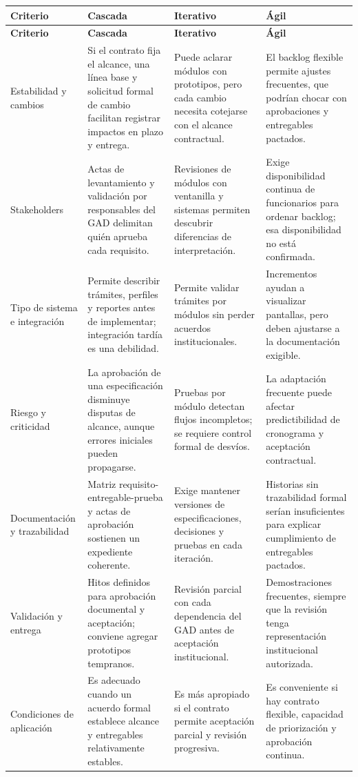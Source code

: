 \documentclass[10pt,a4paper,onecolumn]{IEEEtran}
\begin{document}
\footnotesize
\begin{longtable}{@{}p{2.42cm}p{4.5cm}p{4.5cm}p{4.5cm}@{}}
\toprule
\textbf{Criterio} & \textbf{Cascada} & \textbf{Iterativo} & \textbf{Ágil} \\
\midrule\endfirsthead
\toprule
\textbf{Criterio} & \textbf{Cascada} & \textbf{Iterativo} & \textbf{Ágil} \\
\midrule\endhead
Estabilidad y cambios & Si el contrato fija el alcance, una línea base y solicitud formal de cambio facilitan registrar impactos en plazo y entrega. & Puede aclarar módulos con prototipos, pero cada cambio necesita cotejarse con el alcance contractual. & El backlog flexible permite ajustes frecuentes, que podrían chocar con aprobaciones y entregables pactados. \\
\midrule
Stakeholders & Actas de levantamiento y validación por responsables del GAD delimitan quién aprueba cada requisito. & Revisiones de módulos con ventanilla y sistemas permiten descubrir diferencias de interpretación. & Exige disponibilidad continua de funcionarios para ordenar backlog; esa disponibilidad no está confirmada. \\
\midrule
Tipo de sistema e integración & Permite describir trámites, perfiles y reportes antes de implementar; integración tardía es una debilidad. & Permite validar trámites por módulos sin perder acuerdos institucionales. & Incrementos ayudan a visualizar pantallas, pero deben ajustarse a la documentación exigible. \\
\midrule
Riesgo y criticidad & La aprobación de una especificación disminuye disputas de alcance, aunque errores iniciales pueden propagarse. & Pruebas por módulo detectan flujos incompletos; se requiere control formal de desvíos. & La adaptación frecuente puede afectar predictibilidad de cronograma y aceptación contractual. \\
\midrule
Documentación y trazabilidad & Matriz requisito-entregable-prueba y actas de aprobación sostienen un expediente coherente. & Exige mantener versiones de especificaciones, decisiones y pruebas en cada iteración. & Historias sin trazabilidad formal serían insuficientes para explicar cumplimiento de entregables pactados. \\
\midrule
Validación y entrega & Hitos definidos para aprobación documental y aceptación; conviene agregar prototipos tempranos. & Revisión parcial con cada dependencia del GAD antes de aceptación institucional. & Demostraciones frecuentes, siempre que la revisión tenga representación institucional autorizada. \\
\midrule
Condiciones de aplicación & Es adecuado cuando un acuerdo formal establece alcance y entregables relativamente estables. & Es más apropiado si el contrato permite aceptación parcial y revisión progresiva. & Es conveniente si hay contrato flexible, capacidad de priorización y aprobación continua. \\
\midrule
\end{longtable}
\normalsize
\end{document}
